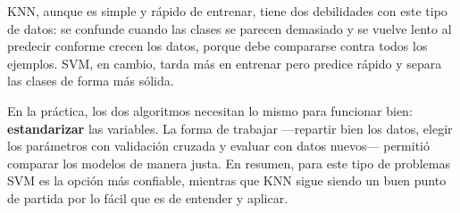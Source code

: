 \documentclass[11pt,letterpaper,twoside]{article}
\begin{document}
KNN, aunque es simple y rápido de entrenar, tiene dos debilidades con este tipo de datos: se confunde cuando las clases se parecen demasiado y se vuelve lento al predecir conforme crecen los datos, porque debe compararse contra todos los ejemplos. SVM, en cambio, tarda más en entrenar pero predice rápido y separa las clases de forma más sólida.

En la práctica, los dos algoritmos necesitan lo mismo para funcionar bien: \textbf{estandarizar} las variables. La forma de trabajar ---repartir bien los datos, elegir los parámetros con validación cruzada y evaluar con datos nuevos--- permitió comparar los modelos de manera justa. En resumen, para este tipo de problemas SVM es la opción más confiable, mientras que KNN sigue siendo un buen punto de partida por lo fácil que es de entender y aplicar.
\end{document}
